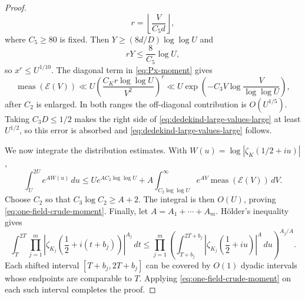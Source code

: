 \documentclass[10pt,a4paper]{amsart}
\renewcommand{\ge}{\geqslant}
\renewcommand{\le}{\leqslant}
\begin{document}
\begin{proof}
\begin{equation*}
        r=\left\lfloor\frac{V}{C_5d}\right\rfloor,
\end{equation*}
where $C_5\ge80$ is fixed.  Then $Y\ge(8d/D)\log\log U$ and
\begin{equation*}
        rY\le\frac{8}{C_5}\log U,
\end{equation*}
so $x^r\le U^{1/10}$.  The diagonal term in \eqref{eq:Px-moment} gives
\begin{equation*}
        \operatorname{meas}(\mathcal E(V))
        \ll
        U\left(\frac{C_Kr\log\log U}{V^2}\right)^r
        \ll
        U\exp\left(-C_3V\log\frac{V}{\log\log U}\right),
\end{equation*}
after $C_2$ is enlarged.  In both ranges the off-diagonal contribution is $O(U^{1/5})$.  Taking $C_3D\le1/2$ makes the right side of \eqref{eq:dedekind-large-values-large} at least $U^{1/2}$, so this error is absorbed and \eqref{eq:dedekind-large-values-large} follows.

We now integrate the distribution estimates.  With $W(u)=\log|\zeta_K(1/2+iu)|$,
\begin{equation*}
        \int_U^{2U}e^{AW(u)}\,du
        \le
        Ue^{AC_2\log\log U}
        +A\int_{C_2\log\log U}^{\infty}
        e^{AV}\operatorname{meas}(\mathcal E(V))\,dV.
\end{equation*}
Choose $C_2$ so that $C_3\log C_2\ge A+2$.  The integral is then $O(U)$, proving \eqref{eq:one-field-crude-moment}.  Finally, let $A=A_1+\cdots+A_m$.  Hölder's inequality gives
\begin{equation*}
\int_T^{2T}\prod_{j=1}^m
\left|\zeta_{K_j}\left(\frac12+i(t+b_j)\right)\right|^{A_j}\,dt
\le
\prod_{j=1}^m
\left(
\int_{T+b_j}^{2T+b_j}
\left|\zeta_{K_j}\left(\frac12+iu\right)\right|^{A}\,du
\right)^{A_j/A}.
\end{equation*}
Each shifted interval $[T+b_j,2T+b_j]$ can be covered by $O(1)$ dyadic intervals whose endpoints are comparable to $T$.  Applying \eqref{eq:one-field-crude-moment} on each such interval completes the proof.
\end{proof}
\end{document}
